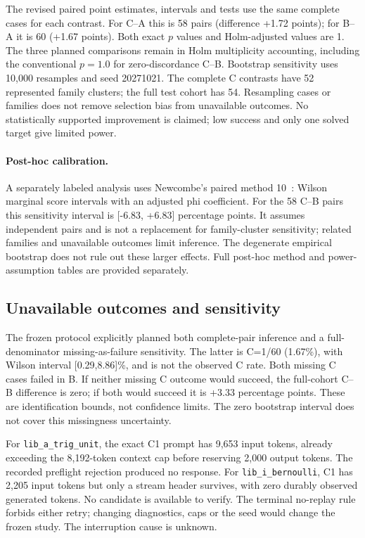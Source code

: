 \documentclass[runningheads,a4paper]{llncs}
\begin{document}


The revised paired point estimates, intervals and tests use the same complete
cases for each contrast. For C--A this is 58 pairs (difference +1.72 points);
for B--A it is 60 (+1.67 points). Both exact $p$ values and Holm-adjusted values
are 1. The three planned comparisons remain in Holm multiplicity accounting,
including the conventional $p=1.0$ for zero-discordance C--B. Bootstrap sensitivity uses 10,000 resamples and
seed 20271021. The complete C contrasts have 52 represented family clusters;
the full test cohort has 54. Resampling cases or families does not remove
selection bias from unavailable outcomes. No statistically supported improvement
is claimed; low success and only one solved target give limited power.

\paragraph{Post-hoc calibration.} A separately labeled analysis uses Newcombe's paired method 10~\cite{newcombe1998paired}: Wilson marginal score intervals with an adjusted phi coefficient. For the 58 C--B pairs this sensitivity interval is [-6.83, +6.83] percentage points. It assumes independent pairs and is not a replacement for family-cluster sensitivity; related families and unavailable outcomes limit inference. The degenerate empirical bootstrap does not rule out these larger effects. Full post-hoc method and power-assumption tables are provided separately.

\subsection{Unavailable outcomes and sensitivity}
The frozen protocol explicitly planned both complete-pair inference and a
full-denominator missing-as-failure sensitivity. The latter is C=1/60 (1.67\%),
with Wilson interval [0.29,8.86]\%, and is not the observed C rate. Both missing
C cases failed in B. If neither missing C outcome would succeed, the full-cohort
C--B difference is zero; if both would succeed it is +3.33 percentage points.
These are identification bounds, not confidence limits. The zero bootstrap
interval does not cover this missingness uncertainty.

For \texttt{lib\_a\_trig\_unit}, the exact C1 prompt has 9,653 input tokens,
already exceeding the 8,192-token context cap before reserving 2,000 output
tokens. The recorded preflight rejection produced no response. For
\texttt{lib\_i\_bernoulli}, C1 has 2,205 input tokens but only a stream header
survives, with zero durably observed generated tokens. No candidate is available
to verify. The terminal no-replay rule forbids either retry; changing diagnostics,
caps or the seed would change the frozen study. The interruption cause is unknown.
\end{document}
